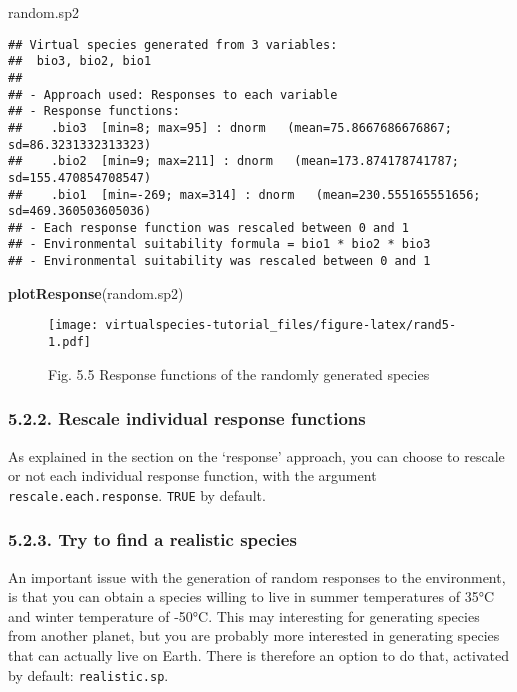\documentclass[]{article}
\newenvironment{Shaded}{\begin{snugshade}}{\end{snugshade}}
\newcommand{\KeywordTok}[1]{\textcolor[rgb]{0.13,0.29,0.53}{\textbf{#1}}}
\newcommand{\NormalTok}[1]{#1}
\begin{document}
\begin{Shaded}
\begin{Highlighting}[]
\NormalTok{random.sp2}
\end{Highlighting}
\end{Shaded}

\begin{verbatim}
## Virtual species generated from 3 variables:
##  bio3, bio2, bio1
## 
## - Approach used: Responses to each variable
## - Response functions:
##    .bio3  [min=8; max=95] : dnorm   (mean=75.8667686676867; sd=86.3231332313323)
##    .bio2  [min=9; max=211] : dnorm   (mean=173.874178741787; sd=155.470854708547)
##    .bio1  [min=-269; max=314] : dnorm   (mean=230.555165551656; sd=469.360503605036)
## - Each response function was rescaled between 0 and 1
## - Environmental suitability formula = bio1 * bio2 * bio3
## - Environmental suitability was rescaled between 0 and 1
\end{verbatim}

\begin{Shaded}
\begin{Highlighting}[]
\KeywordTok{plotResponse}\NormalTok{(random.sp2)}
\end{Highlighting}
\end{Shaded}

\begin{figure}
\centering
\texttt{[image: virtualspecies-tutorial\_files/figure-latex/rand5-1.pdf]}
\caption{Fig. 5.5 Response functions of the randomly generated species}
\end{figure}

\subsubsection{5.2.2. Rescale individual response
functions}\label{rescale-individual-response-functions}

As explained in the section on the `response' approach, you can choose
to rescale or not each individual response function, with the argument
\texttt{rescale.each.response}. \texttt{TRUE} by default.

\subsubsection{5.2.3. Try to find a realistic
species}\label{try-to-find-a-realistic-species}

An important issue with the generation of random responses to the
environment, is that you can obtain a species willing to live in summer
temperatures of 35°C and winter temperature of -50°C. This may
interesting for generating species from another planet, but you are
probably more interested in generating species that can actually live on
Earth. There is therefore an option to do that, activated by default:
\texttt{realistic.sp}.
\end{document}
